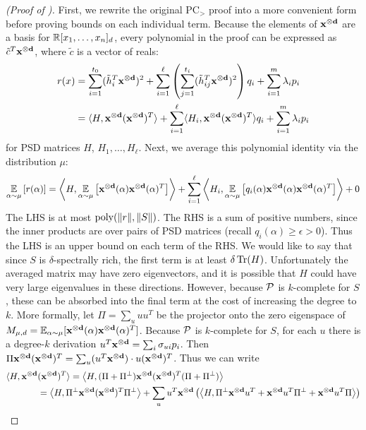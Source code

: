 \begin{proof}[(Proof of )]
First, we rewrite the original PC$_>$ proof into a more convenient form before proving bounds on each individual term. Because the elements of $\mathbf{x^{\otimes d}}$ are a basis for $\mathbb R[x_1,\dots,x_n]_d$, every polynomial in the proof can be expressed as $\tilde{c}^T\mathbf{x^{\otimes d}}$, where $\tilde{c}$ is a vector of reals:
\begin{align*} r(x) &= \sum_{i=1}^{t_0} (\tilde{h}_i^T\mathbf{x^{\otimes d}})^2 + \sum_{i=1}^\ell \left(\sum_{j=1}^{t_i} (\tilde{h}_{ij}^T\mathbf{x^{\otimes d}})^2\right)q_i + \sum_{i=1}^m \lambda_i p_i \\
&= \langle H, \mathbf{x^{\otimes d}}(\mathbf{x^{\otimes d}})^T\rangle + \sum_{i=1}^\ell \langle H_i, \mathbf{x^{\otimes d}}(\mathbf{x^{\otimes d}})^T\rangle q_i + \sum_{i=1}^m \lambda_i p_i
\end{align*}
for PSD matrices $H$, $H_1,\dots,H_\ell$. Next, we average this polynomial identity via the distribution $\mu$:
\begin{align*}
\operatorname*{\mathbb{E}}_{\alpha \sim \mu}\left[r(\alpha)\right] &= \left\langle H, \operatorname*{\mathbb{E}}_{\alpha \sim \mu}\left[\mathbf{x^{\otimes d}}(\alpha)\mathbf{x^{\otimes d}}(\alpha)^T\right]\right\rangle + \sum_{i=1}^\ell \left\langle H_i, \operatorname*{\mathbb{E}}_{\alpha \sim \mu}\left[q_i(\alpha)\mathbf{x^{\otimes d}}(\alpha)\mathbf{x^{\otimes d}}(\alpha)^T\right]\right\rangle + 0 \\
\end{align*}
The LHS is at most $\operatorname{poly}(\|r\|, \|S\|)$. The RHS is a sum of positive numbers, since the inner products are over pairs of PSD matrices (recall $q_i(\alpha) \geq \epsilon > 0$). Thus the LHS is an upper bound on each term of the RHS. 
%
We would like to say that since $S$ is $\delta$-spectrally rich, the first term is at least $\delta \operatorname{Tr}(H)$. 
%
Unfortunately the averaged matrix may have zero eigenvectors, and it is possible that $H$ could have very large eigenvalues in these directions. 
%
However, because $\mathcal P$ is $k$-complete for $S$, these can be absorbed into the final term at the cost of increasing the degree to $k$. More formally, let $\Pi = \sum_u uu^T$ be the projector onto the zero eigenspace of $M_{\mu,d} = \operatorname*{\mathbb{E}}_{\alpha \sim \mu}[\mathbf{x^{\otimes d}}(\alpha)\mathbf{x^{\otimes d}}(\alpha)^T]$. Because $\mathcal P$ is $k$-complete for $S$, for each $u$ there is a degree-$k$ derivation $u^T\mathbf{x^{\otimes d}} = \sum_i \sigma_{ui} p_i$. Then $\Pi \mathbf{x^{\otimes d}}(\mathbf{x^{\otimes d}})^T = \sum_u (u^T\mathbf{x^{\otimes d}}) \cdot u(\mathbf{x^{\otimes d}})^T$. Thus we can write
\begin{align*}
\langle H, \mbasis{d}&(\mbasis{d})^T\rangle = \Iprod{H, (\Pi + \Pi^\perp)\mbasis{d}(\mbasis{d})^T(\Pi + \Pi^\perp)} \\
&= \Iprod{H, \Pi^\perp \mbasis{d}(\mbasis{d})^T \Pi^\perp} + \sum_u u^T\mbasis{d}\left(\Iprod{H, \Pi^\perp \mbasis{d} u^T + \mbasis{d} u^T\Pi^\perp + \mbasis{d} u^T\Pi}\right) \\

\end{align*}
\end{proof}
